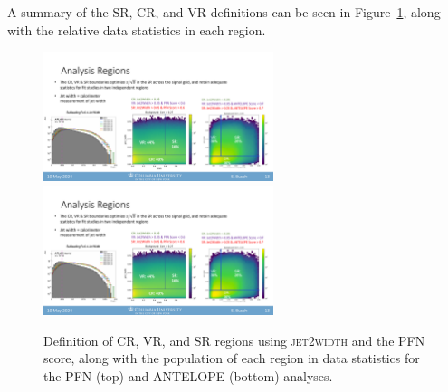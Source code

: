 A summary of the SR, CR, and VR definitions can be seen in Figure~\ref{fig:crvrsr_2d}, along with the relative data statistics in each region.
\begin{figure}[!htbp]
\centering
    \includegraphics[width=0.6\textwidth]{figures/eventsel/crvrsr_2d}
    \includegraphics[width=0.6\textwidth]{figures/eventsel/crvrsr_2d_antelope}
    \caption{Definition of CR, VR, and SR regions using \textsc{jet2width} and the PFN score, along with the population of each region in data statistics for the PFN (top) and ANTELOPE (bottom) analyses. 
    \label{fig:crvrsr_2d}}
\end{figure}



